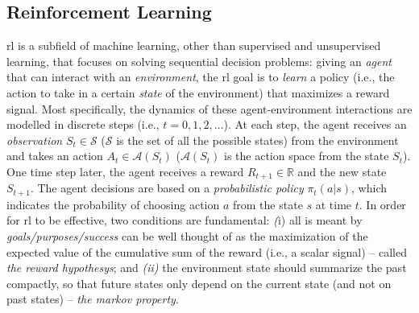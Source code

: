\subsection{Reinforcement Learning}
\ac{rl} is a subfield of machine learning, other than supervised and unsupervised learning,
 that focuses on solving sequential decision problems: 
 giving an \emph{agent} that can interact with an \emph{environment}, the \ac{rl} goal is to \emph{learn} a policy (i.e., the action to take in a certain \emph{state} of the environment) that maximizes a reward signal.
 Most specifically, the dynamics of these agent-environment interactions are modelled in discrete steps (i.e., $t=0,1,2,\dots$). 
 At each step, the agent receives an \emph{observation} $S_t \in \mathcal{S}$ ($\mathcal{S}$ is the
 set of all the possible states) from the environment and takes an action $A_t \in \mathcal{A}(S_t)$ 
 ($\mathcal{A}(S_t)$ is the action space from the state $S_t$).
 One time step later, the agent receives a reward $R_{t+1} \in \mathbb{R}$ and the new state $S_{t+1}$.
 The agent decisions are based on a \emph{probabilistic policy} $\pi_t(a | s)$, which indicates 
 the probability of choosing action $a$ from the state $s$ at time $t$.
In order for \ac{rl} to be effective, two conditions are fundamental: \emph(i) all is meant by \emph{goals/purposes/success} can be well thought of as the maximization of the expected 
    value of the cumulative sum of the reward (i.e., a scalar signal) -- called \emph{the reward hypothesys}; and \emph{(ii)} the environment state should summarize the past compactly, so that future states only depend on the current state (and not on past states) -- 
    \emph{the markov property}.

